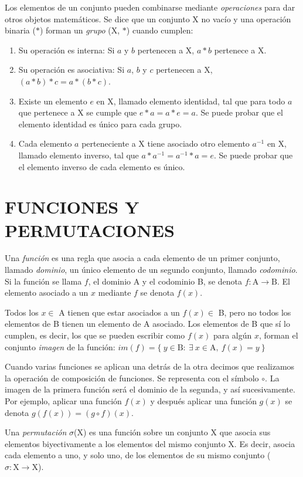 		Los elementos de un conjunto pueden combinarse mediante \emph{operaciones} para dar otros objetos matemáticos. Se dice que un conjunto X no vacío y una operación binaria ($\ast$) forman un \emph{grupo} (X, $\ast$) cuando cumplen:
	
		\begin{enumerate}
			\item{Su operación es interna: Si $a$ y $b$ pertenecen a X, $a\ast b$ pertenece a X.}		\item{Su operación es asociativa: Si $a$, $b$ y $c$ pertenecen a X, $(a\ast b)\ast c=a\ast(b\ast c)$. }
			\item{Existe un elemento $e$ en X, llamado elemento identidad, tal que para todo $a$ que pertenece a X se cumple que $e\ast a = a\ast e = a$. Se puede probar que el elemento identidad es único para cada grupo.}
			\item{Cada elemento $a$ perteneciente a X tiene asociado otro elemento $a^{-1}$ en X, llamado elemento inverso, tal que $a \ast a^{-1} = a^{-1}  \ast a = e$. Se puede probar que el elemento inverso de cada elemento es único.}		
		\end{enumerate}
	
	\section{FUNCIONES Y PERMUTACIONES}
		Una \emph{función} es una regla que asocia a cada elemento de un primer conjunto, llamado \emph{dominio}, un único elemento de un segundo conjunto, llamado \emph{codominio}. Si la función se llama $f$, el dominio A y el codominio B, se denota $f:\text{A}\to \text{B}$. El elemento asociado a un $x$ mediante $f$ se denota $f(x)$.
		
		Todos los $x\in$ A tienen que estar asociados a un $f(x)\in$ B, pero no todos los elementos de B tienen un elemento de A asociado. Los elementos de B que sí lo cumplen, es decir, los que se pueden escribir como $f(x)$ para algún $x$, forman el conjunto \emph{imagen} de la función: $im(f)=\{\ y\in \text{B}:\ \exists\ x \in \text{A},\ f(x)=y\ \}$
		
		Cuando varias funciones se aplican una detrás de la otra decimos que realizamos la operación de composición de funciones. Se representa con el símbolo $\circ$. La imagen de la primera función será el dominio de la segunda, y así sucesivamente. Por ejemplo, aplicar una función $f(x)$ y después aplicar una función $g(x)$ se denota $g(f(x))=(g\circ f)(x)$.
		
		Una \emph{permutación} $\sigma$(X) es una función sobre un conjunto X que asocia sus elementos biyectivamente a los elementos del mismo conjunto X. Es decir, asocia cada elemento a uno, y solo uno, de los elementos de su mismo conjunto ($\sigma:\text{X}\to \text{X}$). \cite{armstrong}

